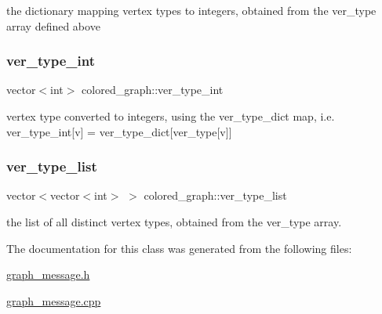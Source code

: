 the dictionary mapping vertex types to integers, obtained from the ver\+\_\+type array defined above 

\mbox{\label{classcolored__graph_a491ed2ea1a65118af02ec606c8d44c0a}} 
\subsubsection{\texorpdfstring{ver\+\_\+type\+\_\+int}{ver\_type\_int}}
{\footnotesize\ttfamily vector$<$int$>$ colored\+\_\+graph\+::ver\+\_\+type\+\_\+int}



vertex type converted to integers, using the ver\+\_\+type\+\_\+dict map, i.\+e. ver\+\_\+type\+\_\+int\mbox{[}v\mbox{]} = ver\+\_\+type\+\_\+dict\mbox{[}ver\+\_\+type\mbox{[}v\mbox{]}\mbox{]} 

\mbox{\label{classcolored__graph_a3a1ae8abac458d20a2afb4aa48bbc956}} 
\subsubsection{\texorpdfstring{ver\+\_\+type\+\_\+list}{ver\_type\_list}}
{\footnotesize\ttfamily vector$<$vector$<$int$>$ $>$ colored\+\_\+graph\+::ver\+\_\+type\+\_\+list}



the list of all distinct vertex types, obtained from the ver\+\_\+type array. 



The documentation for this class was generated from the following files\+:\begin{DoxyCompactItemize}
\item 
\hyperlink{graph__message_8h}{graph\+\_\+message.\+h}\item 
\hyperlink{graph__message_8cpp}{graph\+\_\+message.\+cpp}\end{DoxyCompactItemize}
